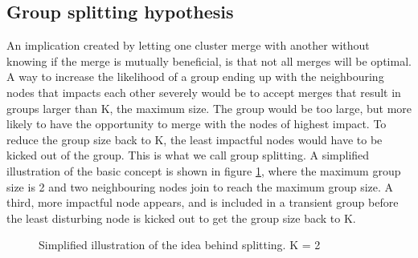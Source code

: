 \subsection{Group splitting hypothesis}
An implication created by letting one cluster merge with another without knowing if the merge is mutually beneficial, is that not all merges will be optimal.
A way to increase the likelihood of a group ending up with the neighbouring nodes that impacts each other severely would be to accept merges that result in groups larger than K, the maximum size. 
The group would be too large, but more likely to have the opportunity to merge with the nodes of highest impact. To reduce the group size back to K,
the least impactful nodes would have to be kicked out of the group. This is what we call group splitting. A simplified illustration of the basic concept is shown in figure \ref{fig:splitting},
where the maximum group size is 2 and two neighbouring nodes join to reach the maximum group size. A third, more impactful node appears, and is included in a transient group
before the least disturbing node is kicked out to get the group size back to K. 

\begin{figure}
	\centering
		\qquad
		\qquad

		\qquad
		\qquad
		\caption{Simplified illustration of the idea behind splitting. K = 2}%
		\label{fig:splitting}%
\end{figure}

